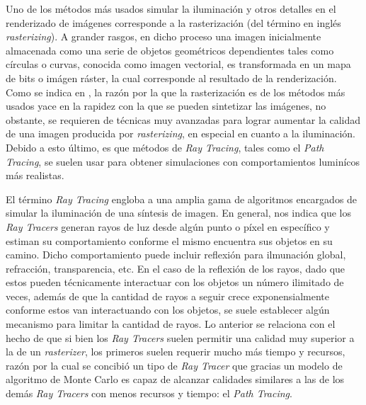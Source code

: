 \documentclass[conference]{IEEEtran}
\begin{document}
Uno de los métodos más usados simular la iluminación y otros detalles en el renderizado de imágenes corresponde a la rasterización (del término en inglés \textit{rasterizing}). A grander rasgos, en dicho proceso una imagen inicialmente almacenada como una serie de objetos geométricos dependientes tales como círculas o curvas, conocida como imagen vectorial, es transformada en un mapa de bits o imágen ráster, la cual corresponde al resultado de la renderización. Como se indica en \cite{b2}, la razón por la que la rasterización es de los métodos más usados yace en la rapidez con la que se pueden sintetizar las imágenes, no obstante, se requieren de técnicas muy avanzadas para lograr aumentar la calidad de una imagen producida por \textit{rasterizing}, en especial en cuanto a la iluminación. Debido a esto último, es que métodos de \textit{Ray Tracing}, tales como el \textit{Path Tracing}, se suelen usar para obtener simulaciones con comportamientos luminícos más realistas. 

El término \textit{Ray Tracing} engloba a una amplia gama de algoritmos encargados de simular la iluminación de una síntesis de imagen. En general, \cite{b2} nos indica que los \textit{Ray Tracers} generan rayos de luz desde algún punto o píxel en específico y estiman su comportamiento conforme el mismo encuentra sus objetos en su camino. Dicho comportamiento puede incluir reflexión para ilmunación global, refracción, transparencia, etc. En el caso de la reflexión de los rayos, dado que estos pueden técnicamente interactuar con los objetos un número ilimitado de veces, además de que la cantidad de rayos a seguir crece exponensialmente conforme estos van interactuando con los objetos, se suele establecer algún mecanismo para limitar la cantidad de rayos. Lo anterior se relaciona con el hecho de que si bien los \textit{Ray Tracers} suelen permitir una calidad muy superior a la de un \textit{rasterizer}, los primeros suelen requerir mucho más tiempo y recursos, razón por la cual se concibió un tipo de \textit{Ray Tracer} que gracias un modelo de algoritmo de Monte Carlo es capaz de alcanzar calidades similares a las de los demás \textit{Ray Tracers} con menos recursos y tiempo: el \textit{Path Tracing}.
\end{document}
